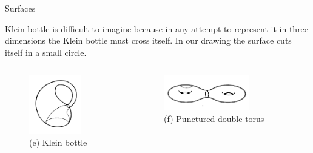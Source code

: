 \documentclass{beamer}
\begin{document}
\begin{frame}{Surfaces}
  \begin{block}{}
    Klein bottle is difficult to imagine because in any attempt to represent it in three dimensions the Klein bottle must cross itself. In our drawing the surface cuts itself in a small circle.
  \end{block}
  \begin{columns}
    \begin{column}{0.5\textwidth}
      \begin{figure}
        \centering
        \includegraphics[width=0.7\textwidth]{figure_1_10_e.png}
        \caption{(e) Klein bottle}
      \end{figure}
    \end{column}
    \begin{column}{0.5\textwidth}
      \begin{figure}
        \centering
        \includegraphics[width=0.7\textwidth]{figure_1_10_f.png}
        \caption{(f) Punctured double torus}
      \end{figure}
    \end{column}
  \end{columns}
\end{frame}
\end{document}
